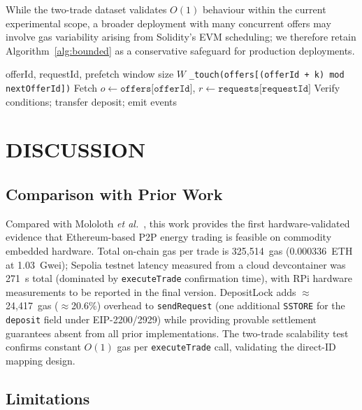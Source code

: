 \documentclass{IEEEoj}
\begin{document}
While the two-trade dataset validates $O(1)$ behaviour within the current
experimental scope, a broader deployment with many concurrent offers may
involve gas variability arising from Solidity's EVM scheduling; we therefore
retain Algorithm~\ref{alg:bounded} as a conservative safeguard for
production deployments.

\begin{algorithm}
\caption{Bounded-Prefetch \texttt{executeTrade}}
\label{alg:bounded}
\begin{algorithmic}[1]
\REQUIRE offerId, requestId, prefetch window size $W$
  \STATE \texttt{\_touch(offers[(offerId + k) mod nextOfferId])}
\ENDFOR
\STATE Fetch $o \leftarrow \texttt{offers[offerId]}$,
       $r \leftarrow \texttt{requests[requestId]}$
\STATE Verify conditions; transfer deposit; emit events
\end{algorithmic}
\end{algorithm}


\section{DISCUSSION}
\label{sec:discussion}

\subsection{Comparison with Prior Work}

Compared with Mololoth \textit{et al.}~\cite{mololoth2022p2p}, this work
provides the first hardware-validated evidence that Ethereum-based P2P
energy trading is feasible on commodity embedded hardware.
Total on-chain gas per trade is 325,514~gas (0.000336~ETH at 1.03~Gwei);
Sepolia testnet latency measured from a cloud devcontainer was 271~s total
(dominated by \texttt{executeTrade} confirmation time), with RPi hardware
measurements to be reported in the final version.
DepositLock adds $\approx$24,417~gas ($\approx$20.6\%) overhead to
\texttt{sendRequest} (one additional \texttt{SSTORE} for the \texttt{deposit}
field under EIP-2200/2929) while providing provable settlement guarantees
absent from all prior implementations.
The two-trade scalability test confirms constant $O(1)$ gas per
\texttt{executeTrade} call, validating the direct-ID mapping design.

\subsection{Limitations}
\end{document}
